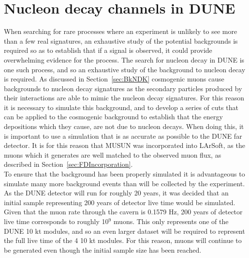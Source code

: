 \section{Nucleon decay channels in DUNE} \label{sec:DUNENDK} %
When searching for rare processes where an experiment is unlikely to see more than a few real signatures, an exhaustive study of the potential backgrounds is required so as to establish that if a signal is observed, it could provide overwhelming evidence for the process. The search for nucleon decay in DUNE is one such process, and so an exhaustive study of the background to nucleon decay is required. As discussed in Section~\ref{sec:BkNDK} cosmogenic muons cause backgrounds to nucleon decay signatures as the secondary particles produced by their interactions are able to mimic the nucleon decay signatures. For this reason it is necessary to simulate this background, and to develop a series of cuts that can be applied to the cosmogenic background to establish that the energy depositions which they cause, are not due to nucleon decays. When doing this, it is important to use a simulation that is as accurate as possible to the DUNE far detector. It is for this reason that MUSUN was incorporated into LArSoft, as the muons which it generates are well matched to the observed muon flux, as described in Section~\ref{sec:FDIncorporation}. \\

To ensure that the background has been properly simulated it is advantageous to simulate many more background events than will be collected by the experiment. As the DUNE detector will run for roughly 20 years, it was decided that an initial sample representing 200 years of detector live time would be simulated. Given that the muon rate through the cavern is 0.1579 Hz, 200 years of detector live time corresponds to roughly 10$^9$ muons. This only represents one of the DUNE 10 kt modules, and so an even larger dataset will be required to represent the full live time of the 4 10 kt modules. For this reason, muons will continue to be generated even though the initial sample size has been reached. \\

